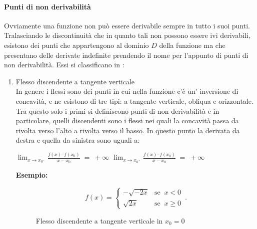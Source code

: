 \documentclass[a4paper,12pt]{report}
\begin{document}
\paragraph{Punti di non derivabilità}
Ovviamente una funzione non può essere derivabile sempre in tutto i suoi punti. Tralasciando le discontinuità che in quanto tali non possono essere ivi derivabili, esistono dei punti che appartengono al dominio $D$ della funzione ma che presentano delle derivate indefinite prendendo il nome per l’appunto di punti di non derivabilità. 
Essi si classificano in : \\
\begin{enumerate}
\item {Flesso discendente a tangente verticale}\\
In genere i flessi sono dei punti in cui nella funzione c’è un’ inversione di concavità, e ne esistono di tre tipi: a tangente verticale, obliqua e orizzontale. Tra questo solo i primi si definiscono punti di non derivabilità e in particolare, quelli discendenti sono i flessi nei quali la concavità passa da rivolta verso l’alto a rivolta verso il basso.
In questo punto la derivata da destra e quella da sinistra sono uguali a: \\
\begin{center}
$\lim_{x\to x_{0^-}}\frac{f(x) – f(x_{0})}{x-x_{0}} \;=\; +\infty$ \qquad
$\lim_{x\to x_{0^+}}\frac{f(x) – f(x_{0})}{x-x_{0}} \;=\; +\infty$
\end{center}
\textbf{Esempio:} \\

\begin{center}
\begin{equation}
	 f(x) = 
      \begin{cases}
        -\sqrt{-2x} & \text{se}\;\; x < 0\\
        \sqrt{2x} & \text{se}\;\; x \geq 0
      \end{cases}\,.
\end{equation}
\end{center}

\begin{figure}[!h]
\begin{center}
	\caption{Flesso discendente a tangente verticale in $x_{0} = 0$}
\end{center}
\end{figure}
\newpage


\end{enumerate}
\end{document}
